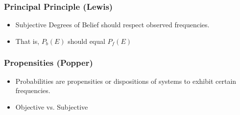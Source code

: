 \documentclass{beamer}
\begin{document}
\frame
{
\frametitle{Principal Principle (Lewis)}

\begin{itemize}
    \item<1-> Subjective Degrees of Belief should respect observed frequencies. 
    \item<2-> That is, $P_b(E)$ should equal $P_f(E)$
\end{itemize}


}


\frame
{
\frametitle{Propensities (Popper)}

\begin{itemize}
    \item<1->  Probabilities are propensities or dispositions of systems to exhibit certain frequencies. 
    \item<2->  Objective vs. Subjective
\end{itemize}

}
\end{document}
